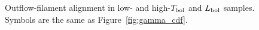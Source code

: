 \documentclass[twocolumn]{aastex63}
\begin{document}
\begin{figure}
\begin{minipage}{\linewidth}
\centering
{}
\end{minipage}\par\medskip
\begin{minipage}{\linewidth}
\centering
{}
\end{minipage}\par\medskip
\caption{Outflow-filament alignment in low- and high-$T_{\rm bol}$ and $L_{\rm bol}$ samples. Symbols are the same as Figure~\ref{fig:gamma_cdf}.}
\label{fig:appendix_gamma_cdf}
\end{figure}
\end{document}
